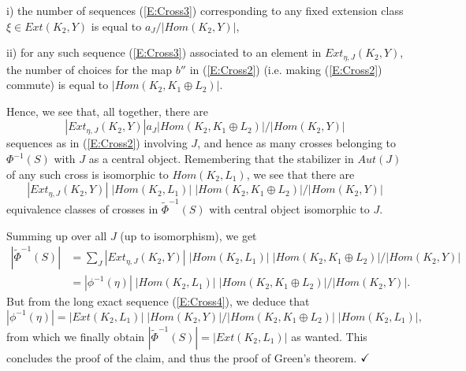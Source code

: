 \documentclass[a4paper,10pt]{amsart}
\def\qed{$\hfill \checkmark$}
\numberwithin{equation}{section}
\begin{document}
\vspace{.05in}

i) the number of sequences (\ref{E:Cross3}) corresponding to any fixed extension class $\xi \in {Ext}(K_2,Y)$ is equal to $a_{J} / |{Hom}(K_2,Y)|$,

\vspace{.05in}

ii) for any such sequence (\ref{E:Cross3}) associated to an element in ${Ext}_{\eta,J}(K_2,Y)$, the number of choices for the map $b''$ in (\ref{E:Cross2}) (i.e. making (\ref{E:Cross2}) commute) is equal to $|{Hom}(K_2, K_1 \oplus L_2)|$.

\vspace{.1in}

Hence, we see that, all together, there are
$$|{Ext}_{\eta,J}(K_2,Y)| a_J |{Hom}(K_2,K_1 \oplus L_2)| /  |{Hom}(K_2,Y)|$$
 sequences as in (\ref{E:Cross2}) involving $J$, and hence as many crosses belonging to
 $\Phi^{-1}(S)$ with $J$ as a central object. Remembering that the stabilizer in ${Aut}(J)$ of any such cross is isomorphic to ${Hom}(K_2,L_1)$, we see that there are
\begin{equation*}
 |{Ext}_{\eta,J}(K_2,Y)| \; |{Hom}(K_2,L_1)| \; |{Hom}(K_2,K_1 \oplus L_2)| /  |{Hom}(K_2,Y)|
\end{equation*}
equivalence classes of crosses in $\widetilde{\Phi}^{-1}(S)$ with central object isomorphic to $J$.

Summing up over all $J$ (up to isomorphism), we get
\begin{equation*}
\begin{split}
 |\widetilde{\Phi}^{-1}(S)|&=
 \sum_J |{Ext}_{\eta,J}(K_2,Y)| \; |{Hom}(K_2,L_1)| \; |{Hom}(K_2,K_1 \oplus L_2)| /  |{Hom}(K_2,Y)|\\
&=| \phi^{-1}(\eta)|\; |{Hom}(K_2,L_1)| \; |{Hom}(K_2,K_1 \oplus L_2)| /  |{Hom}(K_2,Y)|.
\end{split}
\end{equation*}
But from the long exact sequence (\ref{E:Cross4}), we deduce that
$$ |\phi^{-1}(\eta)|=|{Ext}(K_2,L_1)| \;|{Hom}(K_2,Y)|/  |{Hom}(K_2, K_1 \oplus L_2)| \; |{Hom}(K_2,L_1)|,$$
from which we finally obtain $|\widetilde{\Phi}^{-1}(S)|=|{Ext}(K_2,L_1)|$ as wanted. This concludes the proof of the claim, and thus the proof of Green's theorem.
\qed

\vspace{.1in}
\end{document}
